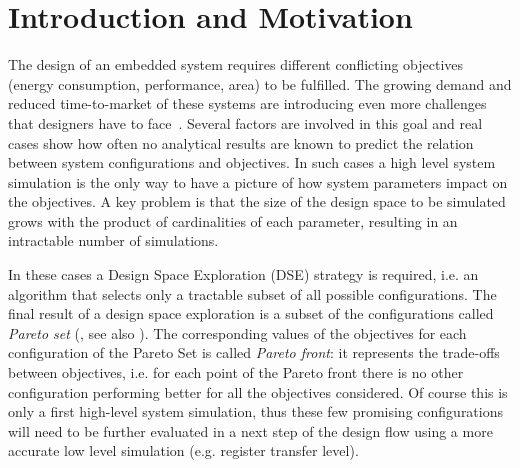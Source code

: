 
\section{Introduction and Motivation}

The design of an embedded system requires different conflicting
objectives (energy consumption, performance, area) to be fulfilled.
The growing demand and reduced time-to-market of these systems are
introducing even more challenges that designers have to
face~\cite{wsts}.
Several factors are involved in this goal and real cases show how
often no analytical results are known to predict the relation between
system configurations and objectives. In such cases a high level
system simulation is the only way to have a picture of how system
parameters impact on the objectives.  A key problem is that the size
of the design space to be simulated grows with the product of
cardinalities of each parameter, resulting in an intractable number
of simulations. 

In these cases a Design Space
Exploration (DSE) strategy is required, i.e. an algorithm that selects
only a tractable subset of all possible configurations.
The final result of a design space exploration is a subset of the
configurations called \emph{Pareto set} (\cite{pareto}, see also
). The corresponding values of the objectives for
each configuration of the Pareto Set is called \emph{Pareto front}:
it represents the trade-offs between objectives, i.e.  for each point
of the Pareto front there is no other configuration performing better
for all the objectives considered. Of course this is only a first
high-level system simulation, thus these few promising
configurations will need to be further evaluated in a next step of the design
flow using a more accurate low level simulation (e.g. register
transfer level).



